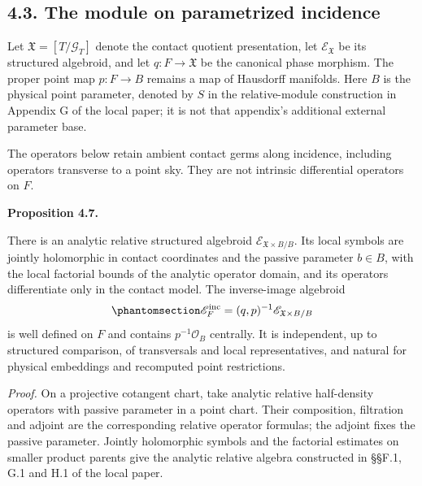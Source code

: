 \documentclass[
  english,
  11pt,
  reqno]{amsart}
\makeatletter
\newcommand{\pandocstatementheading}[1]{%
  \par\addpenalty{\@beginparpenalty}%
  \addvspace{.5\baselineskip plus .2\baselineskip minus .2\baselineskip}%
  {\normalfont\bfseries #1\par}%
  \nobreak\@afterindenttrue\@afterheading
}
\makeatother
\begin{document}
\protect{}\label{sec:operator-parametrized-incidence-v08}

\subsection{4.3. The module on parametrized
incidence}\label{the-module-on-parametrized-incidence}

Let \(\mathfrak X=[T/\mathcal G_T]\) denote the contact quotient
presentation, let \(\mathscr E_{\mathfrak X}\) be its structured
algebroid, and let \(q:F\to\mathfrak X\) be the canonical phase
morphism. The proper point map \(p:F\to B\) remains a map of Hausdorff
manifolds. Here \(B\) is the physical point parameter, denoted by \(S\)
in the relative-module construction in Appendix G of the local paper; it
is not that appendix's additional external parameter base.

The operators below retain ambient contact germs along incidence,
including operators transverse to a point sky. They are not intrinsic
differential operators on \(F\).

\pandocstatementheading{\protect{}\label{prop:relative-operator-incidence-germs}Proposition 4.7.}

There is an analytic relative structured algebroid
\(\mathscr E_{\mathfrak X\times B/B}\). Its local symbols are jointly
holomorphic in contact coordinates and the passive parameter \(b\in B\),
with the local factorial bounds of the analytic operator domain, and its
operators differentiate only in the contact model. The inverse-image
algebroid
\begin{equation}\protect\phantomsection\label{eq:relative-operator-incidence-algebroid}{
\mathscr E_F^{\mathrm{inc}}
=(q,p)^{-1}\mathscr E_{\mathfrak X\times B/B}
}\end{equation} is well defined on \(F\) and contains
\(p^{-1}\mathcal O_B\) centrally. It is independent, up to structured
comparison, of transversals and local representatives, and natural for
physical embeddings and recomputed point restrictions.

\emph{Proof.} On a projective cotangent chart, take analytic relative
half-density operators with passive parameter in a point chart. Their
composition, filtration and adjoint are the corresponding relative
operator formulas; the adjoint fixes the passive parameter. Jointly
holomorphic symbols and the factorial estimates on smaller product
parents give the analytic relative algebra constructed in §§F.1, G.1 and
H.1 of the local paper.
\end{document}
